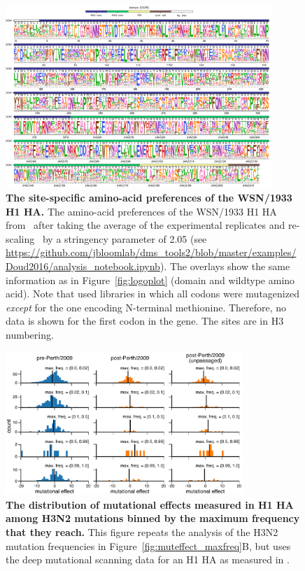 \documentclass[9pt,twoside,lineno]{pnas-new}
\begin{document}
\begin{figure}
\centerline{\includegraphics[width=0.9\textwidth]{figs/supp_WSNprefs_logoplot/WSN-rescaled_prefs.pdf}}
\caption{\label{suppfig:WSNprefs_logoplot}
{\bf The site-specific amino-acid preferences of the WSN/1933 H1 HA.}
The amino-acid preferences of the WSN/1933 H1 HA from~\cite{doud2016accurate} after taking the average of the experimental replicates and re-scaling~\cite{hilton2017phydms} by a stringency parameter of 2.05 (see \url{https://github.com/jbloomlab/dms_tools2/blob/master/examples/Doud2016/analysis_notebook.ipynb}).
The overlays show the same information as in Figure~\ref{fig:logoplot} (domain and wildtype amino acid).
Note that \cite{doud2016accurate} used libraries in which all codons were mutagenized \emph{except} for the one encoding N-terminal methionine.
Therefore, no data is shown for the first codon in the gene.
The sites are in H3 numbering.
}
\end{figure}
\FloatBarrier

\begin{figure}
\centerline{\includegraphics[width=0.8\textwidth]{figs/supp_muteffect_maxfreq_WSN/muteffect_maxfreq_WSN_supp.pdf}}
\caption{\label{suppfig:muteffect_maxfreq_WSN_supp}
{\bf The distribution of mutational effects measured in H1 HA among H3N2 mutations binned by the maximum frequency that they reach.}
This figure repeats the analysis of the H3N2 mutation frequencies in Figure~\ref{fig:muteffect_maxfreq}B, but uses the deep mutational scanning data for an H1 HA as measured in \cite{doud2016accurate}.
}
\end{figure}
\FloatBarrier
\end{document}
